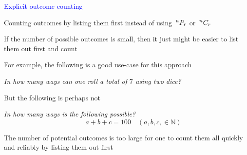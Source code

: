 \documentclass[14pt,fleqn]{extarticle}
\begin{document}
 
\begin{skill}
    \begin{narrow}
         \textcolor{blue}{Explicit outcome counting}
         
         Counting outcomes by listing them first instead of using 
         $\,^{n}P_{r}$ or $\,^{n}C_{r}$ 
    \end{narrow}
    
    \reason 
    
    If the number of possible outcomes is small, then it just might be easier to 
    list them out first and count \newline 
    
    For example, the following is a good use-case for this approach\newline 
    
    \textit{In how many ways can one roll a total of $7$ using two dice?}\newline 
    
    But the following is perhaps not \newline 
    
    \textit{In how many ways is the following possible?}
    \[ \qquad a + b + c = 100\quad \left(a,b,c,\in\mathbb{N} \right)\]
    
    The number of potential outcomes is too large for one to count them all quickly and reliably by listing them out first
\end{skill}
\end{document}

